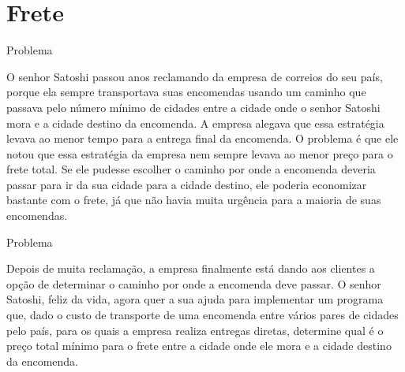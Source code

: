 \section{Frete}

\begin{frame}[fragile]{Problema}

O senhor Satoshi passou anos reclamando da empresa de correios do seu país, porque ela sempre
transportava suas encomendas usando um caminho que passava pelo número mínimo de cidades entre a
cidade onde o senhor Satoshi mora e a cidade destino da encomenda. A empresa alegava que essa
estratégia levava ao menor tempo para a entrega final da encomenda. O problema é que ele notou que
essa estratégia da empresa nem sempre levava ao menor preço para o frete total. Se ele pudesse
escolher o caminho por onde a encomenda deveria passar para ir da sua cidade para a cidade destino,
ele poderia economizar bastante com o frete, já que não havia muita urgência para a maioria de suas
encomendas.

\end{frame}

\begin{frame}[fragile]{Problema}

Depois de muita reclamação, a empresa finalmente está dando aos clientes a opção de determinar o
caminho por onde a encomenda deve passar. O senhor Satoshi, feliz da vida, agora quer a sua ajuda
para implementar um programa que, dado o custo de transporte de uma encomenda entre vários pares de
cidades pelo país, para os quais a empresa realiza entregas diretas, determine qual é o preço total
mínimo para o frete entre a cidade onde ele mora e a cidade destino da encomenda.

\end{frame}

